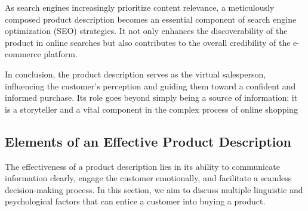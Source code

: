 As search engines increasingly prioritize content relevance, a meticulously composed product description becomes an essential component of search engine optimization (SEO) strategies. It not only enhances the discoverability of the product in online searches but also contributes to the overall credibility of the e-commerce platform.

In conclusion, the product description serves as the virtual salesperson, influencing the customer's perception and guiding them toward a confident and informed purchase. Its role goes beyond simply being a source of information; it is a storyteller and a vital component in the complex process of online shopping \cite{Vos_2023}


\subsection{Elements of an Effective Product Description}
The effectiveness of a product description lies in its ability to communicate information clearly, engage the customer emotionally, and facilitate a seamless decision-making process. In this section, we aim to discuss multiple linguistic and psychological factors that can entice a customer into buying a product.\cite{Vos_2023}

